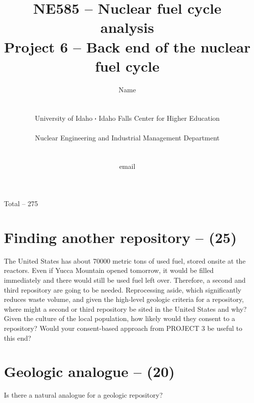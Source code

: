 \documentclass[11pt,a4paper]{article}
\newcommand*\sq{\mathbin{\vcenter{\hbox{\rule{.3ex}{.3ex}}}}} %
\begin{document}
\begin{titlepage}
    \title{
        NE585 -- Nuclear fuel cycle analysis\\
        Project 6 -- Back end of the nuclear fuel cycle\\
    }
    \author{
        Name
        \\ \\ \\
        University of Idaho $\sq$ Idaho Falls Center for Higher Education
        \\ \\
        Nuclear Engineering and Industrial Management Department
        \\ \\ \\
        email 
    }
\clearpage %
\maketitle
\vspace*{\fill}
\begin{flushright}{
        Total -- 275
}
\end{flushright}
\thispagestyle{empty} %
\end{titlepage}


\section{Finding another repository -- (25)}
The United States has about 70000 metric tons of used fuel, stored onsite at the reactors. Even if Yucca Mountain opened tomorrow, it would be filled immediately and there would still be used fuel left over. Therefore, a second and third repository are going to be needed. Reprocessing aside, which significantly reduces waste volume, and given the high-level geologic criteria for a repository, where might a second or third repository be sited in the United States and why? Given the culture of the local population, how likely would they consent to a repository? Would your consent-based approach from PROJECT 3 be useful to this end?





\newpage

\section{Geologic analogue -- (20)}
Is there a natural analogue for a geologic repository? 
\end{document}
